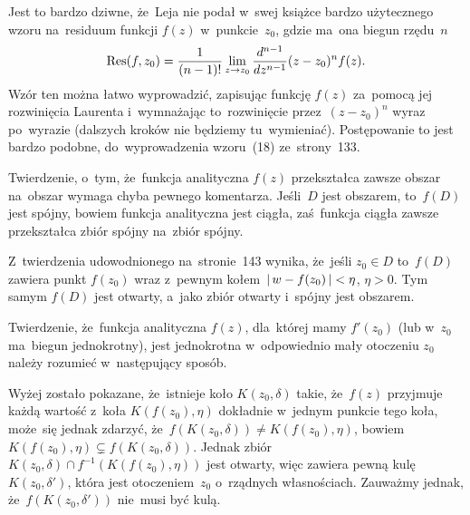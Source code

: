 \documentclass[a4paper,11pt]{article}
\begin{document}
\start {} Jest to bardzo dziwne, że~Leja nie podał w~swej
książce bardzo użytecznego wzoru na~residuum funkcji $f( z )$
w~punkcie~$z_{ 0 }$, gdzie ma~ona biegun rzędu~$n$
\begin{equation}
  \label{eq:Leja-}
  \textrm{Res}( f, z_{ 0 } )
  = \frac{ 1 }{ ( n - 1 )! }
  \lim_{ z \to z_{ 0 } } \frac{ d^{  n - 1  } {   } }{ d {  z  }^{  n - 1  } } ( z - z_{ 0 } )^{ n } f( z ).
\end{equation}
Wzór ten można łatwo wyprowadzić, zapisując funkcję $f( z )$ za~pomocą
jej rozwinięcia Laurenta i~wymnażając to~rozwinięcie
przez~$( z - z_{ 0 } )^{ n }$ wyraz po~wyrazie (dalszych kroków nie
będziemy tu~wymieniać). Postępowanie to jest bardzo podobne,
do~wyprowadzenia wzoru~(18) ze~strony~133.

\vspace{\spaceFour}


\start {} Twierdzenie, o~tym, że~funkcja analityczna $f( z )$
przekształca zawsze obszar na~obszar wymaga chyba pewnego komentarza.
Jeśli~$D$ jest obszarem, to~$f( D )$ jest spójny, bowiem funkcja
analityczna jest ciągła, zaś~funkcja ciągła zawsze przekształca zbiór
spójny na~zbiór spójny.

Z~twierdzenia udowodnionego na~stronie~143 wynika, że~jeśli
$z_{ 0 } \in D$ to~$f( D )$ zawiera punkt $f( z_{ 0 } )$ wraz z~pewnym
kołem~$\left| \,  w - f( z_{ 0 } )  \, \right| < \eta$, $\eta > 0$. Tym samym
$f( D )$ jest otwarty, a~jako zbiór otwarty i~spójny jest obszarem.

\vspace{\spaceFour}


\start {} Twierdzenie, że~funkcja analityczna $f( z )$,
dla~której mamy $f'( z_{ 0 } )$ (lub w~$z_{ 0 }$ ma~biegun
jednokrotny), jest jednokrotna w~odpowiednio mały otoczeniu $z_{ 0 }$
należy rozumieć w~następujący sposób.

Wyżej zostało pokazane, że~istnieje koło $K( z_{ 0 }, \delta )$ takie,
że~$f( z )$ przyjmuje każdą wartość z~koła $K( f( z_{ 0 } ), \eta )$
dokładnie w~jednym punkcie tego koła, może~się jednak zdarzyć,
że~$f( K( z_{ 0 }, \delta ) ) \neq K( f( z_{ 0 } ), \eta )$, bowiem
$K( f( z_{ 0 } ), \eta ) \subsetneq f( K( z_{ 0 }, \delta ) )$. Jednak
zbiór $K( z_{ 0 }, \delta ) \cap f^{ -1 }( K( f( z_{ 0 } ), \eta ) )$
jest otwarty, więc zawiera pewną kulę $K( z_{ 0 }, \delta' )$, która
jest otoczeniem~$z_{ 0 }$ o~rządnych własnościach. Zauważmy jednak,
że~$f( K( z_{ 0 }, \delta' ) )$ nie~musi być kulą.

\vspace{\spaceFour}
\end{document}

